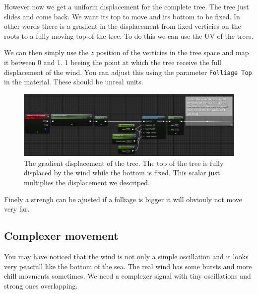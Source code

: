 \documentclass[../main.tex]{subfile}
\begin{document}
However now we get a uniform displacement for the complete tree. The tree just slides and come back. We want its top to move and its bottom to be fixed. In other words 
there is a gradient in the displacement from fixed verticies on the roots to a fully moving top of the tree. To do this we can use the UV of the trees.

We can then simply use the $z$ position of the verticies in the tree space and map it between 0 and 1. 1 beeing the point at which the tree receive the full displacement of the wind.
You can adjust this using the parameter \texttt{Folliage Top} in the material. These should be unreal units.\\
\begin{figure}[H]
    \centering
    \includegraphics[width=1\textwidth]{Ressources/WindGradient.png}
    \caption{The gradient displacement of the tree. The top of the tree is fully displaced by the wind while the bottom is fixed. This scalar just multiplies the displacement 
    we descriped.}
\end{figure}
Finely a strengh can be ajusted if a folliage is bigger it will obviouly not move very far.

\subsection{Complexer movement}
You may have noticed that the wind is not only a simple oscillation and it looks very peacfull like the bottom of the sea. The real wind has some bursts and more chill
movments sometimes. We need a complexer signal with tiny oscillations and strong ones overlapping.
\end{document}
